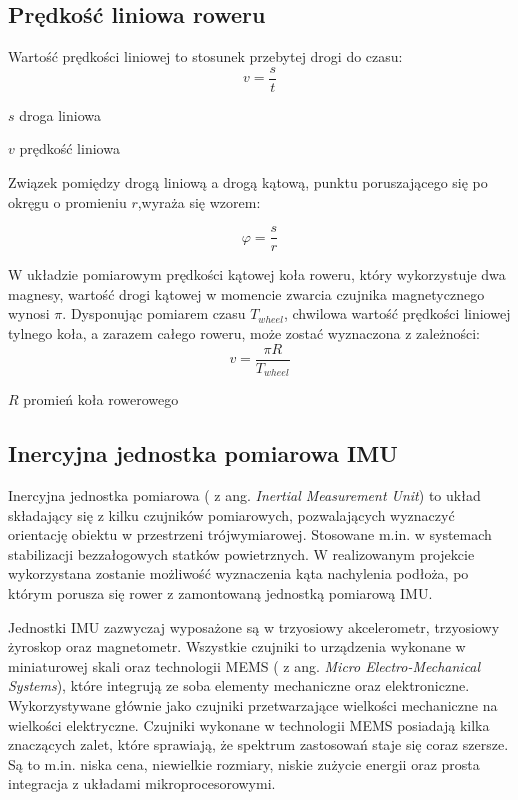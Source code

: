 \subsection{Prędkość liniowa roweru}
Wartość prędkości liniowej to stosunek przebytej drogi do czasu:
\begin{equation}
    v = \frac{s}{t}
\end{equation}
\begin{eqwhere}[2cm]
	\item[$s$] droga liniowa
	\item[$v$] prędkość liniowa
\end{eqwhere}
 Związek pomiędzy drogą liniową a drogą kątową, punktu poruszającego się po okręgu o promieniu $r$,wyraża się wzorem:

\begin{equation}
    \varphi = \frac{s}{r}
\end{equation}

W układzie pomiarowym prędkości kątowej koła roweru, który wykorzystuje dwa magnesy, wartość drogi kątowej w momencie zwarcia czujnika magnetycznego wynosi $\pi$. Dysponując pomiarem czasu $T_{wheel}$, chwilowa wartość prędkości liniowej tylnego koła, a zarazem całego roweru, może zostać wyznaczona z zależności:
 \begin{equation}
    \label{eq:zaleznoscNaPredkosc}
    v = \frac{\pi R}{T_{wheel}}
\end{equation}
\begin{eqwhere}[2cm]
	\item[$R$] promień koła rowerowego
\end{eqwhere}
\subsection{Inercyjna jednostka pomiarowa IMU}
Inercyjna jednostka pomiarowa ( z ang. {\em Inertial Measurement Unit}) to układ składający się z kilku czujników pomiarowych, pozwalających wyznaczyć orientację obiektu w przestrzeni trójwymiarowej. Stosowane m.in. w systemach stabilizacji bezzałogowych statków powietrznych. W realizowanym projekcie wykorzystana zostanie możliwość wyznaczenia kąta nachylenia podłoża, po którym porusza się rower z zamontowaną jednostką pomiarową IMU.

Jednostki IMU zazwyczaj wyposażone są w trzyosiowy akcelerometr, trzyosiowy żyroskop oraz magnetometr. Wszystkie czujniki to urządzenia wykonane w miniaturowej skali oraz technologii MEMS ( z ang. {\em Micro Electro-Mechanical Systems}), które integrują ze soba elementy mechaniczne oraz elektroniczne. Wykorzystywane głównie jako czujniki przetwarzające wielkości mechaniczne na wielkości elektryczne. Czujniki wykonane w technologii MEMS posiadają kilka znaczących zalet, które sprawiają, że spektrum zastosowań staje się coraz szersze. Są to m.in. niska cena, niewielkie rozmiary, niskie zużycie energii oraz prosta integracja z układami mikroprocesorowymi. 

